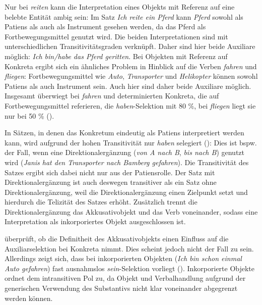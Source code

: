 Nur bei \textit{reiten} kann die Interpretation eines Objekts mit Referenz auf eine belebte Entität ambig sein: Im Satz \textit{Ich reite ein Pferd} kann \textit{Pferd} sowohl als Patiens als auch als Instrument gesehen werden, da das Pferd als Fortbewegungsmittel genutzt wird. Die beiden Interpretationen sind mit unterschiedlichen Transitivitätsgraden verknüpft. Daher sind hier beide Auxiliare möglich: \textit{Ich bin/habe das Pferd geritten}. Bei Objekten mit Referenz auf Konkreta ergibt sich ein ähnliches Problem in Hinblick auf die Verben \textit{fahren} und \textit{fliegen}: Fortbewegungsmittel wie \textit{Auto}, \textit{Transporter} und \textit{Helikopter} können sowohl Patiens als auch Instrument sein. Auch hier sind daher beide Auxiliare möglich. Insgesamt überwiegt bei \textit{fahren} und determinierten Konkreta, die auf Fortbewegungsmittel referieren, die \textit{haben}-Selektion mit 80 \%, bei \textit{fliegen} liegt sie nur bei 50 \% (\cite[286]{Gillmann.2016}). 



In Sätzen, in denen das Konkretum eindeutig als Patiens interpretiert werden kann, wird aufgrund der hohen Transitivität nur \textit{haben} selegiert (\cite[284--285]{Gillmann.2016}): Dies ist bspw. der Fall, wenn eine Direktionalergänzung (\textit{von A nach B}, \textit{bis nach B}) genutzt wird (\textit{Janis hat den Transporter nach Bamberg gefahren}). Die Transitivität des Satzes ergibt sich dabei nicht nur aus der Patiensrolle. Der Satz mit Direktionalergänzung ist auch deswegen transitiver als ein Satz ohne Direktionalergänzung, weil die Direktionalergänzung einen Zielpunkt setzt und hierdurch die Telizität des Satzes erhöht. Zusätzlich trennt die Direktionalergänzung das Akkusativobjekt und das Verb voneinander, sodass eine Interpretation als inkorporiertes Objekt ausgeschlossen ist. 



\textcite[286--291]{Gillmann.2016} überprüft, ob die Definitheit des Akkusativobjekts einen Einfluss auf die Auxiliarselektion bei Konkreta nimmt. Dies scheint jedoch nicht der Fall zu sein. Allerdings zeigt sich, dass bei inkorporierten Objekten (\textit{Ich bin schon einmal Auto gefahren}) fast ausnahmslos \textit{sein}-Selektion vorliegt (\cite[290--291]{Gillmann.2016}). Inkorporierte Objekte ordnet \textcite[290]{Gillmann.2016} dem intransitiven Pol zu, da Objekt und Verbalhandlung aufgrund der generischen Verwendung des Substantivs nicht klar voneinander abgegrenzt werden können.  




